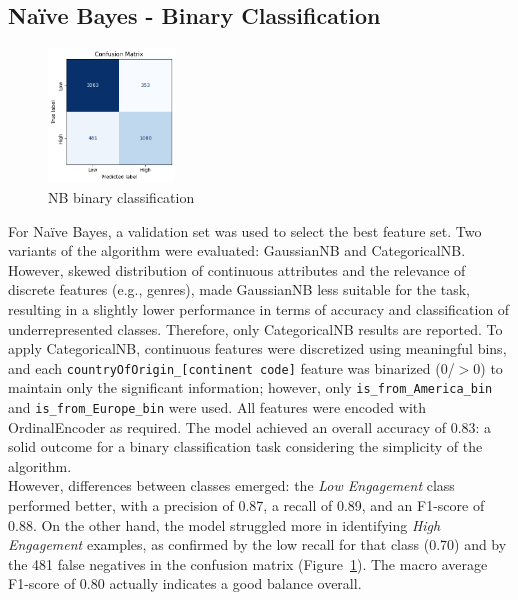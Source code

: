 \subsection{Naïve Bayes - Binary Classification}

\begin{figure}
    \centering
    \includegraphics[width=0.30\textwidth]{plots/nb_binary_confmatrix.png}
    \caption{NB binary classification}
    \label{fig:nb_binary}
\end{figure}
For Naïve Bayes, a validation set was used to select the best feature set. Two variants of the algorithm were evaluated: GaussianNB and CategoricalNB. 
However, skewed distribution of continuous attributes and the relevance of discrete features (e.g., genres), made GaussianNB less suitable 
for the task, resulting in a slightly lower performance in terms of accuracy and classification of underrepresented classes. 
Therefore, only CategoricalNB results are reported. 
To apply CategoricalNB, continuous features were discretized using meaningful bins, and each \texttt{countryOfOrigin\_[continent code]} feature was binarized (0/$>$0) to maintain only the significant information; 
however, only \texttt{is\_from\_America\_bin} and \texttt{is\_from\_Europe\_bin} were used. All features were encoded with OrdinalEncoder as required.
The model achieved an overall accuracy of 0.83: a solid outcome for a binary classification task considering the simplicity of the algorithm.\\

However, differences between classes emerged: the \textit{Low Engagement} class performed better, with a precision of 0.87, a recall of 0.89, and an F1-score of 0.88.
On the other hand, the model struggled more in identifying \textit{High Engagement} examples, as confirmed by the low recall for that class (0.70) and by the 481 false 
negatives in the confusion matrix (Figure~\ref{fig:nb_binary}). The macro average F1-score of 0.80 actually indicates a good balance overall.




